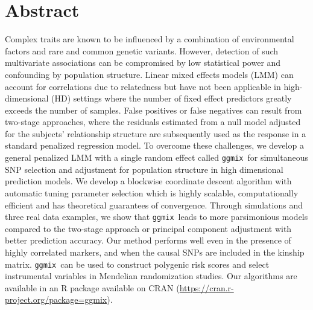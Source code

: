 \documentclass[10pt,letterpaper]{article}
\newcommand{\ggmix}{\texttt{ggmix}}
\begin{document}
\section*{Abstract}
Complex traits are known to be influenced by a combination of environmental factors and rare and common genetic variants. However, detection of such multivariate associations can be compromised by low statistical power and confounding by population structure. Linear mixed effects models (LMM) can account for correlations due to relatedness but have not been applicable in high-dimensional (HD) settings where the number of fixed effect predictors greatly exceeds the number of samples. False positives or false negatives can result from two-stage approaches, where the residuals estimated from a null model adjusted for the subjects' relationship structure are subsequently used as the response in a standard penalized regression model. To overcome these challenges, we develop a general penalized LMM with a single random effect called \ggmix ~for simultaneous SNP selection and adjustment for population structure in high dimensional prediction models. We develop a blockwise coordinate descent algorithm with automatic tuning parameter selection which is highly scalable, computationally efficient and has theoretical guarantees of convergence. Through simulations and three real data examples, we show that \ggmix ~leads to more parsimonious models compared to the two-stage approach or principal component adjustment with better prediction accuracy. Our method performs well even in the presence of highly correlated markers, and when the causal SNPs are included in the kinship matrix. \ggmix ~can be used to construct polygenic risk scores and select instrumental variables in Mendelian randomization studies. Our algorithms are available in an R package available on CRAN (\url{https://cran.r-project.org/package=ggmix}).


\end{document}
